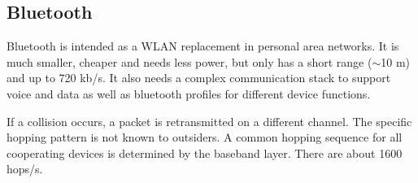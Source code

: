 \subsection{Bluetooth}
\begin{mytitle}[Bluetooth] Bluetooth is intended as a WLAN replacement in personal area networks. It is much smaller, cheaper and needs less power, but only has a short range ($\sim$10 m) and up to 720 kb/s. It also needs a complex communication stack to support voice and data as well as bluetooth profiles for different device functions. 
\end{mytitle}

\begin{mytitle} If a collision occurs, a packet is retransmitted on a different channel. The specific hopping pattern is not known to outsiders. A common hopping sequence for all cooperating devices is determined by the baseband layer. There are about 1600 hops/s.
\end{mytitle}
